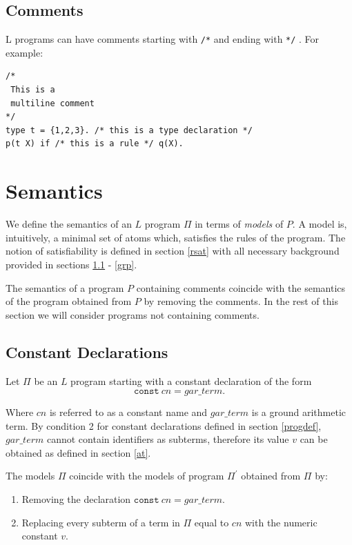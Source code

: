 \documentclass[a4paper,10pt]{article}
\begin{document}
\subsection{Comments}

L programs can have comments starting with \texttt{/*} and ending with \texttt{*/} . For example:

\begin{verbatim}
/*
 This is a
 multiline comment
*/
type t = {1,2,3}. /* this is a type declaration */
p(t X) if /* this is a rule */ q(X). 
\end{verbatim}


\section{Semantics}
We define the semantics of an $L$ program $\Pi$ in terms of \textit{models} of $P$. A model is, intuitively,  a minimal set of atoms which, satisfies the rules of the program. 
The notion of satisfiability is defined in section \ref{rsat} with all necessary background provided in sections 
\ref{constants} - \ref{grp}.

The semantics of a program $P$ containing comments coincide with the semantics of the program obtained from $P$ by removing the comments. In the rest of this section we will consider programs not containing comments.




\subsection{Constant Declarations} \label{constants}


Let $\Pi$ be an $L$ program starting with a constant declaration of the form
$$\texttt{const} ~cn = gar\_term.$$

Where $cn$ is referred to as a constant name and $gar\_term$ is a ground arithmetic term.
By condition 2 for constant declarations defined in section \ref{progdef}, $gar\_term$ cannot contain identifiers as subterms,
therefore its value $v$ can be obtained as defined in section \ref{at}. 

The models $\Pi$ coincide with the models of program $\Pi^\prime$ obtained from $\Pi$ by:
\begin{enumerate}
\item Removing the declaration $\texttt{const}~cn = gar\_term.$
\item Replacing every subterm of a term in $\Pi$ equal to $cn$ with the numeric constant $v$. 
\end{enumerate} 
\end{document}
